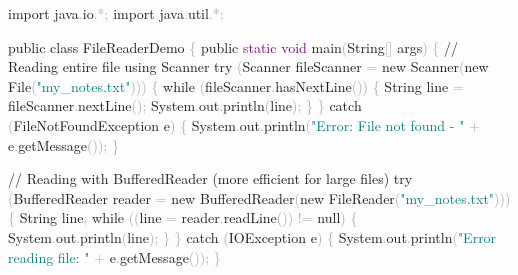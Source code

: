 \documentclass[
  justified,
  openright,
]{tufte-book}
\newcommand{\BuiltInTok}[1]{#1}
\newcommand{\CommentTok}[1]{\textcolor{MidGray}{#1}}
\newcommand{\ControlFlowTok}[1]{\textcolor{BrandBlue}{#1}}
\newcommand{\DataTypeTok}[1]{\textcolor{Purple}{#1}}
\newcommand{\FunctionTok}[1]{\textcolor{BrandBlue}{#1}}
\newcommand{\ImportTok}[1]{\textcolor{BrandAccent}{#1}}
\newcommand{\KeywordTok}[1]{\textcolor{BrandBlue}{#1}}
\newcommand{\NormalTok}[1]{#1}
\newcommand{\OperatorTok}[1]{\textcolor{DarkGray}{#1}}
\newcommand{\StringTok}[1]{\textcolor{Teal}{#1}}
\newenvironment{Shaded}{%
  \begin{snugshade}
}{%
  \end{snugshade}
}
\begin{document}
\begin{Shaded}
\begin{Highlighting}[]
\KeywordTok{import} \ImportTok{java}\OperatorTok{.}\ImportTok{io}\OperatorTok{.*;}
\KeywordTok{import} \ImportTok{java}\OperatorTok{.}\ImportTok{util}\OperatorTok{.*;}

\KeywordTok{public} \KeywordTok{class}\NormalTok{ FileReaderDemo }\OperatorTok{\{}
    \KeywordTok{public} \DataTypeTok{static} \DataTypeTok{void} \FunctionTok{main}\OperatorTok{(}\BuiltInTok{String}\OperatorTok{[]}\NormalTok{ args}\OperatorTok{)} \OperatorTok{\{}
        \CommentTok{// Reading entire file using Scanner}
        \ControlFlowTok{try} \OperatorTok{(}\BuiltInTok{Scanner}\NormalTok{ fileScanner }\OperatorTok{=} \KeywordTok{new} \BuiltInTok{Scanner}\OperatorTok{(}\KeywordTok{new} \BuiltInTok{File}\OperatorTok{(}\StringTok{"my\_notes.txt"}\OperatorTok{)))} \OperatorTok{\{}
            \ControlFlowTok{while} \OperatorTok{(}\NormalTok{fileScanner}\OperatorTok{.}\FunctionTok{hasNextLine}\OperatorTok{())} \OperatorTok{\{}
                \BuiltInTok{String}\NormalTok{ line }\OperatorTok{=}\NormalTok{ fileScanner}\OperatorTok{.}\FunctionTok{nextLine}\OperatorTok{();}
                \BuiltInTok{System}\OperatorTok{.}\FunctionTok{out}\OperatorTok{.}\FunctionTok{println}\OperatorTok{(}\NormalTok{line}\OperatorTok{);}
            \OperatorTok{\}}
        \OperatorTok{\}} \ControlFlowTok{catch} \OperatorTok{(}\BuiltInTok{FileNotFoundException}\NormalTok{ e}\OperatorTok{)} \OperatorTok{\{}
            \BuiltInTok{System}\OperatorTok{.}\FunctionTok{out}\OperatorTok{.}\FunctionTok{println}\OperatorTok{(}\StringTok{"Error: File not found {-} "} \OperatorTok{+}\NormalTok{ e}\OperatorTok{.}\FunctionTok{getMessage}\OperatorTok{());}
        \OperatorTok{\}}

        \CommentTok{// Reading with BufferedReader (more efficient for large files)}
        \ControlFlowTok{try} \OperatorTok{(}\BuiltInTok{BufferedReader}\NormalTok{ reader }\OperatorTok{=} \KeywordTok{new} \BuiltInTok{BufferedReader}\OperatorTok{(}\KeywordTok{new} \BuiltInTok{FileReader}\OperatorTok{(}\StringTok{"my\_notes.txt"}\OperatorTok{)))} \OperatorTok{\{}
            \BuiltInTok{String}\NormalTok{ line}\OperatorTok{;}
            \ControlFlowTok{while} \OperatorTok{((}\NormalTok{line }\OperatorTok{=}\NormalTok{ reader}\OperatorTok{.}\FunctionTok{readLine}\OperatorTok{())} \OperatorTok{!=} \KeywordTok{null}\OperatorTok{)} \OperatorTok{\{}
                \BuiltInTok{System}\OperatorTok{.}\FunctionTok{out}\OperatorTok{.}\FunctionTok{println}\OperatorTok{(}\NormalTok{line}\OperatorTok{);}
            \OperatorTok{\}}
        \OperatorTok{\}} \ControlFlowTok{catch} \OperatorTok{(}\BuiltInTok{IOException}\NormalTok{ e}\OperatorTok{)} \OperatorTok{\{}
            \BuiltInTok{System}\OperatorTok{.}\FunctionTok{out}\OperatorTok{.}\FunctionTok{println}\OperatorTok{(}\StringTok{"Error reading file: "} \OperatorTok{+}\NormalTok{ e}\OperatorTok{.}\FunctionTok{getMessage}\OperatorTok{());}
        \OperatorTok{\}}


\end{Highlighting}
\end{Shaded}
\end{document}
